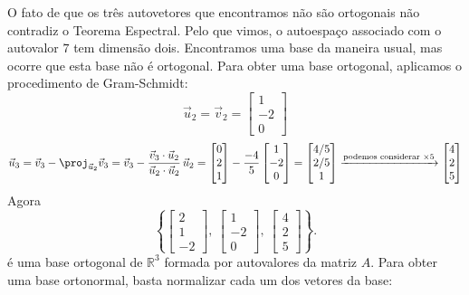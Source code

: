 \begin{ex}
	O fato de que os três autovetores que encontramos não são ortogonais não contradiz o Teorema Espectral. Pelo que vimos, o autoespaço associado com o autovalor $7$ tem dimensão dois. Encontramos uma base da maneira usual, mas ocorre que esta base não é ortogonal. Para obter uma base ortogonal, aplicamos o procedimento de Gram-Schmidt:
	\begin{equation}
	\vec{u}_2 = \vec{v}_2 =
	\begin{bmatrix}
	1 \\ -2 \\ 0
	\end{bmatrix}
	\end{equation}
	\begin{equation}
	\vec{u}_3 = \vec{v}_3 - \proj_{\vec{u}_2} \vec{v}_3 = \vec{v}_3 - \frac{\vec{v}_3 \cdot \vec{u}_2}{\vec{u}_2 \cdot \vec{u}_2} \, \vec{u}_2 =
	\begin{bmatrix}
	0 \\ 2 \\ 1
	\end{bmatrix} - \frac{-4}{5}
	\begin{bmatrix}
	1 \\ -2 \\ 0
	\end{bmatrix} =
	\begin{bmatrix}
	4/5 \\ 2/5 \\ 1
	\end{bmatrix} \xrightarrow{\text{podemos considerar } \times 5}
	\begin{bmatrix}
	4 \\ 2 \\ 5
	\end{bmatrix}
	\end{equation} Agora
	\begin{equation}
	\left\lbrace
	\begin{bmatrix}
	2 \\ 1 \\ -2
	\end{bmatrix}, \
	\begin{bmatrix}
	1 \\ -2 \\ 0
	\end{bmatrix}, \
	\begin{bmatrix}
	4 \\ 2 \\ 5
	\end{bmatrix}
	\right\rbrace.
	\end{equation} é uma base ortogonal de $\mathbb{R}^3$ formada por autovalores da matriz $A$. Para obter uma base ortonormal, basta normalizar cada um dos vetores da base:

\end{ex}
